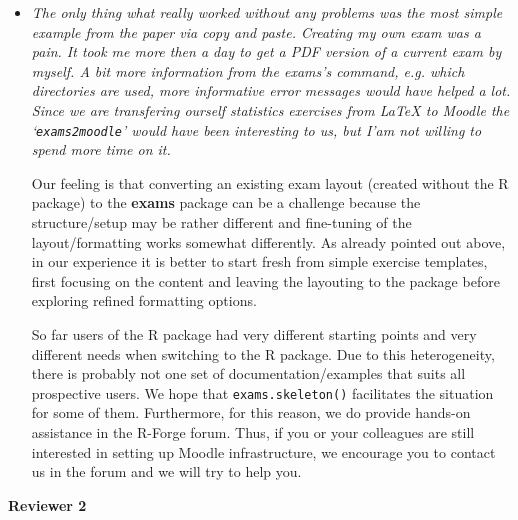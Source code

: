 \documentclass[american]{uibkletter}
\begin{document}
\begin{itemize}
\item {\it
The only thing what really worked without any problems was the most simple
example from the paper via copy and paste.  Creating my own exam was a pain. 
It took me more then a day to get a PDF version of a current exam by myself. 
A bit more information from the exams's command, e.g.  which directories are
used, more informative error messages would have helped a lot.  Since we are
transfering ourself statistics exercises from {\LaTeX} to Moodle the
`\texttt{exams2moodle}' would have been interesting to us, but I'am not willing to
spend more time on it.}

Our feeling is that converting an existing exam layout (created without
the R package) to the \textbf{exams} package can be a challenge because the structure/setup
may be rather different and fine-tuning of the layout/formatting works somewhat
differently. As already pointed out above, in our experience it is better to
start fresh from simple exercise templates, first focusing on the content and leaving the layouting to
the package before exploring refined formatting options.

So far users of the R package had very different starting points and very different
needs when switching to the R package. Due to this heterogeneity, there is
probably not one set of documentation/examples that suits all prospective users.
We hope that \texttt{exams.skeleton()} facilitates the situation for some of them.
Furthermore, for this reason, we do provide hands-on assistance in the R-Forge
forum. Thus, if you or your colleagues are still interested in setting up
Moodle infrastructure, we encourage you to contact us in the forum and we will
try to help you.

\end{itemize}

\bigskip

\textbf{\Large Reviewer 2}

\medskip
\end{document}
